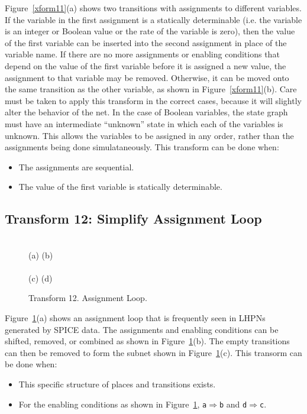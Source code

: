 \documentclass[titlepage,11pt]{article}
\begin{document}
Figure~\ref{xform11}(a) shows two transitions with assignments to different
variables.  If the variable in the first assignment is a statically determinable
(i.e. the variable is an integer or Boolean value or the rate of the variable is 
zero), then the value of the first variable can be inserted into the second
assignment in place of the variable name.  If there are no more assignments or 
enabling conditions that depend on the value of the first variable before it is 
assigned a new value, the assignment to that variable may be removed.  Otherwise,
it can be moved onto the same transition as the other variable, as shown in
Figure~\ref{xform11}(b).  Care must be taken to apply this transform in the 
correct cases, because it will slightly alter the behavior of the net.  In the 
case of Boolean variables, the state graph must have an intermediate ``unknown'' 
state in which each of the variables is unknown.  This allows the variables to be
assigned in any order, rather than the assignments being done simulataneously.  
This transform can be done when:
\begin{itemize}
\item The assignments are sequential.
\item The value of the first variable is statically determinable.
\end{itemize}


\subsection{Transform 12: Simplify Assignment Loop}
\label{reduce12}

\begin{figure}[tbh]
\begin{center}
\scalebox{0.5}{}
\scalebox{0.5}{} \\
(a) \hspace{50mm} (b) \\
\scalebox{0.5}{}
\scalebox{0.5}{} \\
(c) \hspace{50mm} (d)
{\caption{\label{xform12}Transform 12. Assignment Loop.}}
\end{center}
\end{figure}

Figure~\ref{xform12}(a) shows an assignment loop that is frequently seen in LHPNs
generated by SPICE data.  The assignments and enabling conditions can be shifted,
removed, or combined as shown in Figure~\ref{xform12}(b).  The empty transitions
can then be removed to form the subnet shown in Figure~\ref{xform12}(c).  This 
transorm can be done when:
\begin{itemize}
\item This specific structure of places and transitions exists.
\item For the enabling conditions as shown in Figure~\ref{xform12}, {\tt a$\Rightarrow$b} and {\tt d$\Rightarrow$c}.
\end{itemize}
\end{document}

